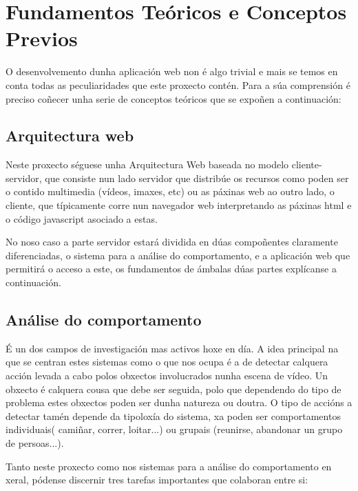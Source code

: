 \chapter{Fundamentos Teóricos e Conceptos Previos}

O desenvolvemento dunha aplicación web non é algo trivial e mais se temos en conta todas
as peculiaridades que este proxecto contén. Para a súa comprensión é preciso coñecer unha
serie de conceptos teóricos que se expoñen a continuación:

\section{Arquitectura web}
	Neste proxecto séguese unha Arquitectura Web baseada no modelo cliente-servidor, que 
	consiste nun lado servidor que distribúe os recursos como poden ser o contido multimedia
	(vídeos, imaxes, etc) ou as páxinas web ao outro lado, o cliente, que típicamente corre 
	nun navegador web interpretando as páxinas html e o código javascript asociado a estas.
	
	No noso caso a parte servidor estará dividida en dúas compoñentes claramente diferenciadas,
	o sistema para a análise do comportamento, e a aplicación web que permitirá o acceso a este, 
	os fundamentos de ámbalas dúas partes explícanse a continuación.
	
\section{Análise do comportamento}
	É un dos campos de investigación mas activos hoxe en día. A idea principal na que se 
	centran estes sistemas como o que nos ocupa é a de detectar calquera acción levada a 
	cabo polos obxectos involucrados nunha escena de vídeo. Un obxecto é calquera cousa 
	que debe ser seguida, polo que dependendo do tipo de problema estes obxectos poden 
	ser dunha natureza ou doutra.
	O tipo de accións a detectar tamén depende da tipoloxía do sistema, xa poden ser
	comportamentos individuais( camiñar, correr, loitar...) ou grupais (reunirse, abandonar
	un grupo de persoas...).
	
	Tanto neste proxecto como nos sistemas para a análise do comportamento en xeral, 
	pódense discernir tres tarefas importantes que colaboran entre si\cite{brais-thesis}:
	
